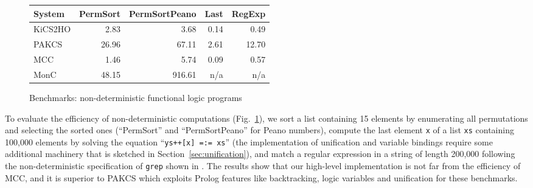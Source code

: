\documentclass{llncs}
\newcommand{\code}[1]{\mbox{\small\texttt{#1}}}
\newcommand{\ccode}[1]{``\code{#1}''}
\begin{document}
\begin{figure}
\centering
\begin{tabular}{|@{~~}l@{~~}|*{4}{@{~~}r@{~~}|}}
\hline
System  & PermSort & PermSortPeano &  Last & RegExp \\\hline
KiCS2HO &    2.83  &        3.68   &  0.14 &   0.49 \\
PAKCS   &   26.96  &       67.11   &  2.61 &  12.70 \\
MCC     &    1.46  &        5.74   &  0.09 &   0.57 \\
MonC    &   48.15  &      916.61   &   n/a &    n/a \\
\hline
\end{tabular}
\caption{Benchmarks: non-deterministic functional logic programs}
 \label{fig:bench-nondet}
\end{figure}
%
To evaluate the efficiency of non-deterministic computations
(Fig.~\ref{fig:bench-nondet}),
we sort a list containing 15 elements by enumerating all permutations
and selecting the sorted ones (``PermSort'' and ``PermSortPeano''
for Peano numbers),
compute the last element \code{x}
of a list \code{xs} containing 100,000 elements
by solving the equation \ccode{ys++[x] =:= xs}
(the implementation of unification and variable bindings
require some additional machinery that is sketched in
Section~\ref{sec:unification}),
and match a regular expression in a string of length 200,000
following the non-deterministic specification of \code{grep} shown
in \cite{AntoyHanus10CACM}.
The results show that our high-level implementation is not far
from the efficiency of MCC,
and it is superior to PAKCS which exploits Prolog features
like backtracking, logic variables and unification for these benchmarks.
\end{document}

